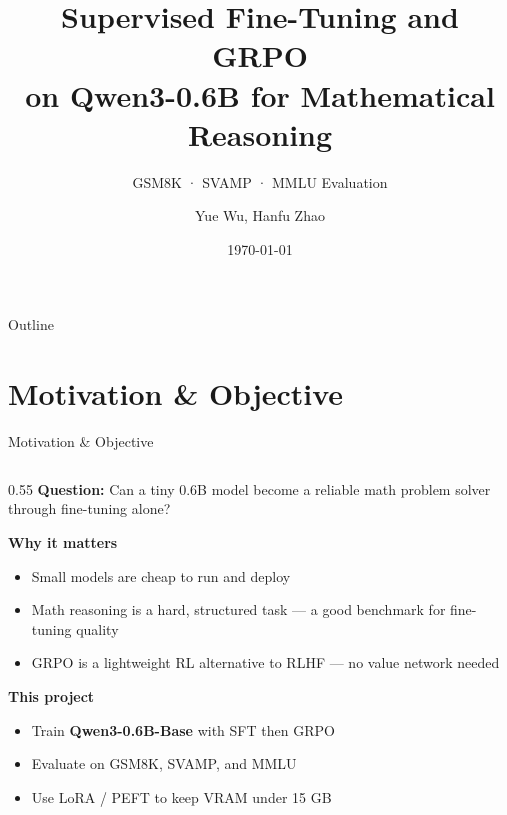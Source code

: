\documentclass[aspectratio=169,10pt]{beamer}
\title[SFT + GRPO on Qwen3-0.6B]{%
  Supervised Fine-Tuning and GRPO\\
  on Qwen3-0.6B for Mathematical Reasoning}
\subtitle{GSM8K · SVAMP · MMLU Evaluation}
\author{Yue Wu, Hanfu Zhao}
\date{\today}
\begin{document}
\begin{frame}
  \titlepage
\end{frame}

\begin{frame}{Outline}
  \tableofcontents
\end{frame}



\section{Motivation \& Objective}
\begin{frame}{Motivation \& Objective}

  \begin{columns}[T]
    \begin{column}{0.55\textwidth}
      \textbf{Question:} Can a tiny 0.6B model become a reliable
      math problem solver through fine-tuning alone?

      \vspace{0.8em}
      \textbf{Why it matters}
      \begin{itemize}
        \item Small models are cheap to run and deploy
        \item Math reasoning is a hard, structured task — a
              good benchmark for fine-tuning quality
        \item GRPO is a lightweight RL alternative to RLHF
              — no value network needed
      \end{itemize}

      \vspace{0.8em}
      \textbf{This project}
      \begin{itemize}
        \item Train \textbf{Qwen3-0.6B-Base} with SFT then GRPO
        \item Evaluate on GSM8K, SVAMP, and MMLU
        \item Use LoRA / PEFT to keep VRAM under 15 GB
      \end{itemize}
    \end{column}


\end{columns}
\end{frame}
\end{document}

